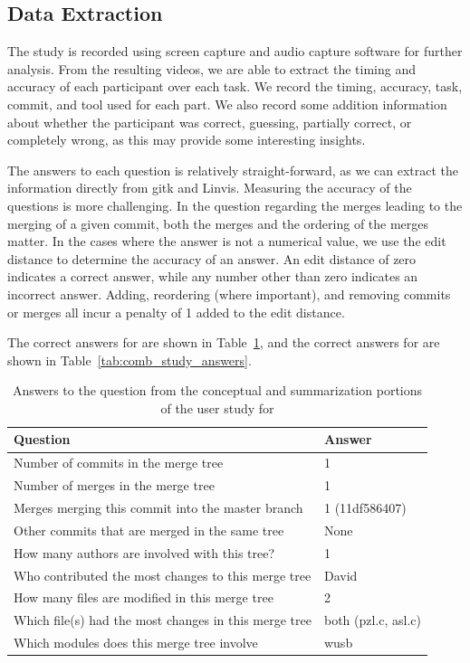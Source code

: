 \subsection{Data Extraction}
\label{sub:data_extraction}

The study is recorded using screen capture and audio capture software
for further analysis. From the resulting videos, we are able to extract
the timing and accuracy of each participant over each task. We record
the timing, accuracy, task, commit, and tool used for each part. We also
record some addition information about whether the participant was
correct, guessing, partially correct, or completely wrong, as this may
provide some interesting insights.

The answers to each question is relatively straight-forward, as we can
extract the information directly from gitk and Linvis. Measuring the
accuracy of the questions is more challenging. In the question regarding
the merges leading to the merging of a given commit, both the merges and
the ordering of the merges matter. In the cases where the answer is not
a numerical value, we use the edit distance to determine the accuracy of
an answer. An edit distance of zero indicates a correct answer, while
any number other than zero indicates an incorrect answer. Adding,
reordering (where important), and removing commits or merges all incur a
penalty of 1 added to the edit distance.

The correct answers for \comA are shown in
Table~\ref{tab:coma_study_answers}, and the correct answers for \comB are
shown in Table~\ref{tab:comb_study_answers}.

\begin{table}[htpb]
  \centering
  \caption{Answers to the question from the conceptual and summarization portions of the user study for \comA}
  \label{tab:coma_study_answers}
  \begin{tabular}{l|l}
    Question                                              & Answer \\\hline\hline
    Number of commits in the merge tree                   & 1\\
    Number of merges in the merge tree                    & 1\\\hline
    Merges merging this commit into the master branch     & 1 (11df586407)\\
    Other commits that are merged in the same tree        & None\\
    How many authors are involved with this tree?         & 1\\
    Who contributed the most changes to this merge tree   & David\\
    How many files are modified in this merge tree        & 2\\
    Which file(s) had the most changes in this merge tree & both (pzl.c, asl.c)\\
    Which modules does this merge tree involve & wusb
  \end{tabular}
\end{table}


